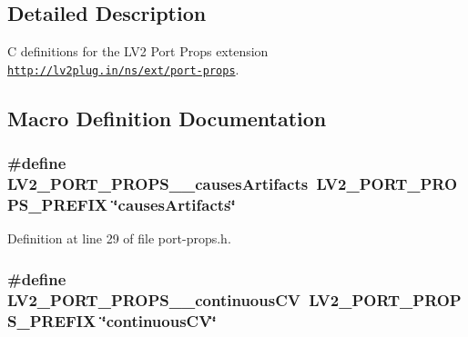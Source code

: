 \subsection{Detailed Description}
C definitions for the L\+V2 Port Props extension \href{http://lv2plug.in/ns/ext/port-props}{\tt http\+://lv2plug.\+in/ns/ext/port-\/props}. 

\subsection{Macro Definition Documentation}
\subsubsection[{\texorpdfstring{L\+V2\+\_\+\+P\+O\+R\+T\+\_\+\+P\+R\+O\+P\+S\+\_\+\+\_\+causes\+Artifacts}{LV2_PORT_PROPS__causesArtifacts}}]{\setlength{\rightskip}{0pt plus 5cm}\#define L\+V2\+\_\+\+P\+O\+R\+T\+\_\+\+P\+R\+O\+P\+S\+\_\+\+\_\+causes\+Artifacts~{\bf L\+V2\+\_\+\+P\+O\+R\+T\+\_\+\+P\+R\+O\+P\+S\+\_\+\+P\+R\+E\+F\+IX} \char`\"{}causes\+Artifacts\char`\"{}}\hypertarget{port-props_8h_a34689601db4fc8071f63596825e3d6cc}{}\label{port-props_8h_a34689601db4fc8071f63596825e3d6cc}


Definition at line 29 of file port-\/props.\+h.

\subsubsection[{\texorpdfstring{L\+V2\+\_\+\+P\+O\+R\+T\+\_\+\+P\+R\+O\+P\+S\+\_\+\+\_\+continuous\+CV}{LV2_PORT_PROPS__continuousCV}}]{\setlength{\rightskip}{0pt plus 5cm}\#define L\+V2\+\_\+\+P\+O\+R\+T\+\_\+\+P\+R\+O\+P\+S\+\_\+\+\_\+continuous\+CV~{\bf L\+V2\+\_\+\+P\+O\+R\+T\+\_\+\+P\+R\+O\+P\+S\+\_\+\+P\+R\+E\+F\+IX} \char`\"{}continuous\+CV\char`\"{}}\hypertarget{port-props_8h_a4478b8b9e3372d159de0a5deac8e7239}{}\label{port-props_8h_a4478b8b9e3372d159de0a5deac8e7239}


